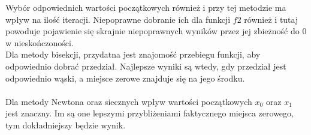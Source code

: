 \documentclass[15pt, a4paper]{article}
\begin{document}
\noindent Wybór odpowiednich wartości początkowych również i przy tej metodzie ma wpływ na ilość iteracji. Niepoprawne dobranie ich dla funkcji \(f2\) również i tutaj powoduje pojawienie się skrajnie niepoprawnych wyników przez jej zbieżność do 0 w nieskończoności.\\ 


\noindent Dla metody bisekcji, przydatna jest znajomość przebiegu funkcji, aby odpowiednio dobrać przedział. Najlepsze wyniki są wtedy, gdy przedział jest odpowiednio wąski, a miejsce zerowe znajduje się na jego środku. \\\\
Dla metody Newtona oraz siecznych wpływ wartości początkowych \(x_0\) oraz \(x_1\) jest znaczny. Im są one lepszymi przybliżeniami faktycznego miejsca zerowego, tym dokładniejszy będzie wynik.\\\\
\end{document}
